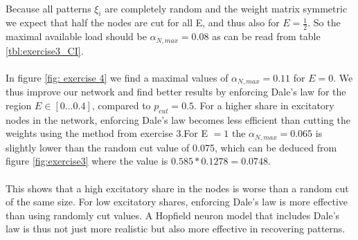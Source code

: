 \paragraph*{}
Because all patterns $\xi_i$ are completely random and the weight matrix symmetric we expect that half the nodes are cut for all E, and thus also for $E = \frac{1}{2}$.
So the maximal available load should be $\alpha_{N,max} = 0.08$ as can be read from table \ref{tbl:exercise3_CI}. 

\paragraph*{}
In figure \ref{fig: exercise 4} we find a maximal values of $\alpha_{N,max} = 0.11 $ for $E=0$. We thus improve our network and find better results by enforcing Dale's law for the region $E \in [0 \ldots 0.4]$, compared to $p_{cut} =0.5$. For a higher share in excitatory nodes in the network, enforcing Dale's law becomes less efficient than cutting the weights using the method from exercise 3.For E $ = 1$ the $\alpha_{N,max}=0.065$ is slightly lower than the random cut  value of 0.075, which can be deduced from figure \ref{fig:exercise3} where the value is $0.585*0.1278=0.0748$.

\paragraph*{}
This shows that a high excitatory share in the nodes is worse than a random cut of the same size. For low excitatory shares, enforcing Dale's law is more effective than using randomly cut values. A Hopfield neuron model that includes Dale's law is thus not just more realistic but also more effective in recovering patterns. 


	